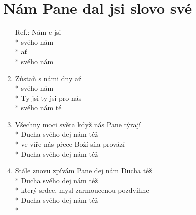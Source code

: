 \section{Nám Pane dal jsi slovo své}  %
\begin{enumerate}
\item[Ref.:] Nám e  jsi   \\*
 svého  nám   \\*
ať     \\*
 svého  nám 
\item Zůstaň  s námi  dny až \\*
 svého  nám   \\*
Ty jsi  ty jsi  pro nás  \\*
 svého  nám té  
\item Všechny moci světa když nás Pane týrají \\*
Ducha svého dej nám též \\*
ve víře nás přece Boží síla provází \\*
Ducha svého dej nám též 
\item Stále znovu zpívám Pane dej nám Ducha též \\*
Ducha svého dej nám též \\*
který srdce, mysl zarmoucenou pozdvihne \\*
Ducha svého dej nám též \\*
\end{enumerate}
